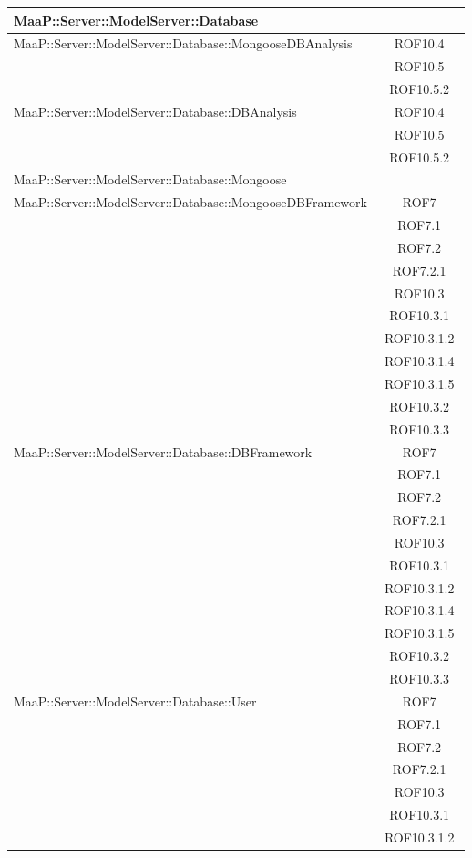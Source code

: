 \begin{center}
\begin{longtable}{|p{0.8\linewidth}|c|}
\midrule 
MaaP::Server::ModelServer::Database
& \\

\midrule 
MaaP::Server::ModelServer::Database::MongooseDBAnalysis
& ROF10.4\\
& ROF10.5\\
& ROF10.5.2\\

\midrule 
MaaP::Server::ModelServer::Database::DBAnalysis
& ROF10.4\\
& ROF10.5\\
& ROF10.5.2\\

\midrule 
MaaP::Server::ModelServer::Database::Mongoose
& \\

\midrule 
MaaP::Server::ModelServer::Database::MongooseDBFramework
& ROF7\\
& ROF7.1\\
& ROF7.2\\
& ROF7.2.1\\
& ROF10.3\\
& ROF10.3.1\\
& ROF10.3.1.2\\
& ROF10.3.1.4\\
& ROF10.3.1.5\\
& ROF10.3.2\\
& ROF10.3.3\\


\midrule 
MaaP::Server::ModelServer::Database::DBFramework
& ROF7\\
& ROF7.1\\
& ROF7.2\\
& ROF7.2.1\\
& ROF10.3\\
& ROF10.3.1\\
& ROF10.3.1.2\\
& ROF10.3.1.4\\
& ROF10.3.1.5\\
& ROF10.3.2\\
& ROF10.3.3\\


\midrule 
MaaP::Server::ModelServer::Database::User
& ROF7\\
& ROF7.1\\
& ROF7.2\\
& ROF7.2.1\\
& ROF10.3\\
& ROF10.3.1\\
& ROF10.3.1.2\\


\end{longtable}
\end{center}
